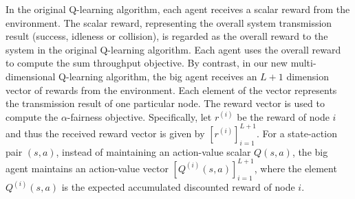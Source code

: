 \documentclass[journal,comsoc]{IEEEtran}
\begin{document}
In the original Q-learning algorithm, each agent receives a scalar reward from the environment. The scalar reward, representing the overall system transmission result (success, idleness or collision), is regarded as the overall reward to the system in the original Q-learning algorithm. Each agent uses the overall reward to compute the sum throughput objective. By contrast, in our new multi-dimensional Q-learning algorithm, the big agent receives an   $ L+1 $ dimension vector of rewards from the environment. Each element of the vector represents the transmission result of one particular node. The reward vector is used to compute the  $ \alpha $-fairness objective. Specifically, let $ {r^{\left( i \right)}} $  be the reward of node $ i $  and thus the received reward vector is given by   $  \left[ {{r^{\left( i \right)}}} \right]_{i = 1}^{L + 1}$. For a state-action pair  $ (s,a) $, instead of maintaining an action-value scalar  $Q\left( {s,a} \right)$, the big agent maintains an action-value vector  $\left[ {{Q^{\left( i \right)}}\left( {s,a} \right)} \right]_{i = 1}^{L + 1}$, where  the element ${Q^{\left( i \right)}}\left( {s,a} \right)$  is the expected accumulated discounted reward of node  $ i $. 
\end{document}
